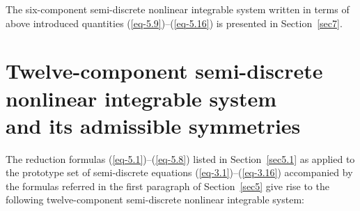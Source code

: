 \documentclass[pdftex]{sigma}
\numberwithin{equation}{section}
\begin{document}
The six-component semi-discrete nonlinear integrable system written in terms of above introduced quantities (\ref{eq-5.9})--(\ref{eq-5.16}) is presented in Section~\ref{sec7}.


\section[Twelve-component semi-discrete nonlinear integrable system and its admissible symmetries]{Twelve-component semi-discrete nonlinear integrable system\\ and its admissible symmetries}
\label{sec6}


The reduction formulas (\ref{eq-5.1})--(\ref{eq-5.8}) listed in Section~\ref{sec5.1} as applied to the prototype set of semi-discrete equations (\ref{eq-3.1})--(\ref{eq-3.16})
accompanied by the formulas referred in the first paragraph of Section~\ref{sec5} give rise to the following twelve-component semi-discrete nonlinear integrable system:
\end{document}
